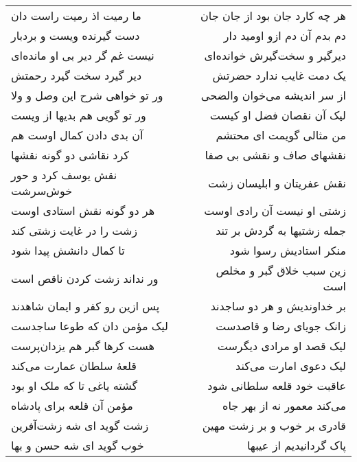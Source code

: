 \begin{center}
\begin{longtable}{l p{0.5cm} r}
ما رمیت اذ رمیت راست دان
&&
هر چه کارد جان بود از جان جان
\\
دست گیرنده ویست و بردبار
&&
دم بدم آن دم ازو اومید دار
\\
نیست غم گر دیر بی او مانده‌ای
&&
دیرگیر و سخت‌گیرش خوانده‌ای
\\
دیر گیرد سخت گیرد رحمتش
&&
یک دمت غایب ندارد حضرتش
\\
ور تو خواهی شرح این وصل و ولا
&&
از سر اندیشه می‌خوان والضحی
\\
ور تو گویی هم بدیها از ویست
&&
لیک آن نقصان فضل او کیست
\\
آن بدی دادن کمال اوست هم
&&
من مثالی گویمت ای محتشم
\\
کرد نقاشی دو گونه نقشها
&&
نقشهای صاف و نقشی بی صفا
\\
نقش یوسف کرد و حور خوش‌سرشت
&&
نقش عفریتان و ابلیسان زشت
\\
هر دو گونه نقش استادی اوست
&&
زشتی او نیست آن رادی اوست
\\
زشت را در غایت زشتی کند
&&
جمله زشتیها به گردش بر تند
\\
تا کمال دانشش پیدا شود
&&
منکر استادیش رسوا شود
\\
ور نداند زشت کردن ناقص است
&&
زین سبب خلاق گبر و مخلص است
\\
پس ازین رو کفر و ایمان شاهدند
&&
بر خداوندیش و هر دو ساجدند
\\
لیک مؤمن دان که طوعا ساجدست
&&
زانک جویای رضا و قاصدست
\\
هست کرها گبر هم یزدان‌پرست
&&
لیک قصد او مرادی دیگرست
\\
قلعهٔ سلطان عمارت می‌کند
&&
لیک دعوی امارت می‌کند
\\
گشته یاغی تا که ملک او بود
&&
عاقبت خود قلعه سلطانی شود
\\
مؤمن آن قلعه برای پادشاه
&&
می‌کند معمور نه از بهر جاه
\\
زشت گوید ای شه زشت‌آفرین
&&
قادری بر خوب و بر زشت مهین
\\
خوب گوید ای شه حسن و بها
&&
پاک گردانیدیم از عیبها
\\
\end{longtable}
\end{center}
